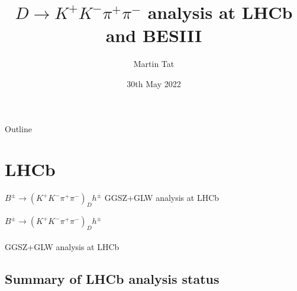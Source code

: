 \documentclass{beamer}
\title[$K^+K^-\pi^+\pi^-$]{\texorpdfstring{$D\to K^+K^-\pi^+\pi^-$}{K+K-pi+pi-} analysis at LHCb and BESIII}
\author{Martin Tat}
\institute{Oxford LHCb}
\date{30th May 2022}
\begin{document}
\begin{frame}
  \titlepage
\end{frame}

\begin{frame}{Outline}
  \tableofcontents
\end{frame}

\section{LHCb}

\begin{frame}{$B^\pm\to(K^+K^-\pi^+\pi^-)_Dh^\pm$ GGSZ+GLW analysis at LHCb}
  \begin{center}
    {\huge $B^\pm\to(K^+K^-\pi^+\pi^-)_Dh^\pm$ \\~\\GGSZ+GLW analysis at LHCb}
  \end{center}
\end{frame}

\subsection{Summary of LHCb analysis status}
\end{document}
